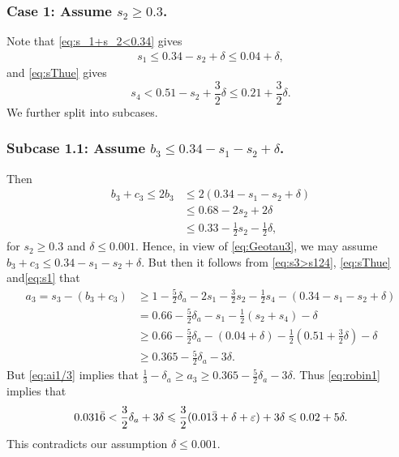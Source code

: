\subsubsection*{Case 1: Assume $s_2\ge 0.3$.}

Note that \eqref{eq:s_1+s_2<0.34} gives
\begin{align}\label{eq:s1}
s_1 \leq  0.34-s_2+\delta \le 0.04+\delta,
\end{align}
and \eqref{eq:sThue} gives $$
s_4 < 0.51-s_2 +\frac{3}{2}\delta\le 0.21 +\frac{3}{2}\delta.
$$
We further split into subcases.

\subsubsection*{Subcase 1.1: Assume $b_3\le 0.34-s_1-s_2+\delta$.}

Then
\begin{align*}
b_3+c_3\le 2b_3
&\le 2(0.34-s_1-s_2+\delta)\\
&\le 0.68-2s_2 +2\delta \\
&\leq 0.33 -\frac{1}{2}s_2-\frac{1}{2}\delta,
\end{align*}
for $s_2\ge0.3$ and $\delta\leq 0.001$.
Hence, in view of  \eqref{eq:Geotau3}, we may assume $b_3+c_3\le 0.34-s_1-s_2+\delta$.
But then it follows from \eqref{eq:s3>s124}, \eqref{eq:sThue} and\eqref{eq:s1} that
\begin{align*}
a_3 = s_3 - (b_3 + c_3)
& \ge 1 -
\frac{5}{2}\delta_a-
2s_1 - \frac{3}{2}s_2 - \frac{1}{2}s_4 - (0.34-s_1-s_2+\delta)\\
& = 0.66
-\frac{5}{2}\delta_a
- s_1 - \frac{1}{2}(s_2 + s_4)-\delta\\
& \geq 0.66
-\frac{5}{2}\delta_a
- (0.04+\delta) - \frac{1}{2}(0.51+\frac{3}{2}\delta)-\delta\\
&\ge 0.365
-\frac{5}{2}\delta_a -3\delta.
\end{align*}
But \eqref{eq:ai1/3} implies that $\frac{1}{3}-\delta_a \ge a_3\geq 0.365
-\frac{5}{2}\delta_a -3\delta$. Thus \eqref{eq:robin1} implies that
$$
0.031\bar 6<\frac{3}{2}\delta_a +3\delta
\leqslant \frac{3}{2}(0.01\bar{3}+\delta+\varepsilon) +3\delta \leqslant 0.02+5\delta.
$$
This contradicts our assumption $\delta\leq 0.001$.


